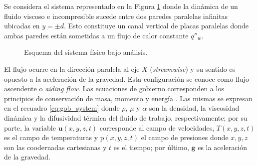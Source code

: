 Se considera el sistema representado en la Figura \ref{fig:sistem_domain} donde la dinámica de un fluido viscoso e incompresible sucede entre dos paredes paralelas infinitas ubicadas en $y=\pm d$. Esto constituye un canal vertical de placas paralelas donde ambas paredes están sometidas a un flujo de calor constante $q''_w$.

\begin{figure}[H]
 \centering
 \caption{Esquema del sistema físico bajo análisis.} 
 \label{fig:sistem_domain}
\end{figure}

El flujo ocurre en la dirección paralela al eje $X$ (\textit{streamwise}) y su sentido es opuesto a la aceleración de la gravedad. Esta configuración se conoce como flujo ascendente o \textit{aiding flow}. Las ecuaciones de gobierno corresponden a los principios de conservación de masa, momento y energía \cite{zhou2024direct}. Las mismas se expresan en el recuadro \ref{eq:gob_system} donde $\rho$, $\mu$ y $\alpha$ son la densidad, la viscosidad dinámica y la difusividad térmica del fluido de trabajo, respectivamente; por su parte, la variable $\mathbf{u}(x,y,z,t)$ corresponde al campo de velocidades, $T(x,y,z,t)$ es el campo de temperaturas y $\text{p}(x,y,z,t)$ el campo de presiones donde $x,y,z$ son las coodernadas cartesianas y $t$ es el tiempo; por último, $\mathbf{g}$ es la aceleración de la gravedad.


